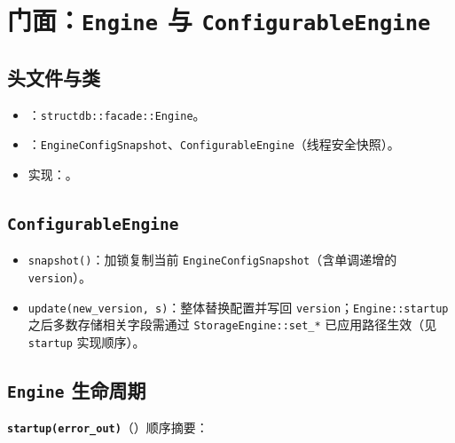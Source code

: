 \section{门面：\texttt{Engine} 与 \texttt{ConfigurableEngine}}
\label{sec:mod-facade}

\subsection{头文件与类}

\begin{itemize}
  \item {}：\texttt{structdb::facade::Engine}。
  \item {}：\texttt{EngineConfigSnapshot}、\texttt{ConfigurableEngine}（线程安全快照）。
  \item 实现：。
\end{itemize}

\subsection{\texttt{ConfigurableEngine}}

\begin{itemize}
  \item \texttt{snapshot()}：加锁复制当前 \texttt{EngineConfigSnapshot}（含单调递增的 \texttt{version}）。
  \item \texttt{update(new\_version, s)}：整体替换配置并写回 \texttt{version}；\texttt{Engine::startup} 之后多数存储相关字段需通过 \texttt{StorageEngine::set\_*} 已应用路径生效（见 \texttt{startup} 实现顺序）。
\end{itemize}

\subsection{\texttt{Engine} 生命周期}

\textbf{\texttt{startup(error\_out)}}（）顺序摘要：

